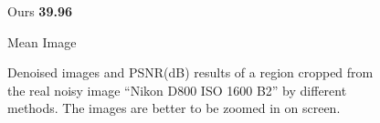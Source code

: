 \begin{figure}
{\begin{minipage}[t]{0.19\textwidth}
{\footnotesize Ours \textbf{39.96}}
\end{minipage}
\begin{minipage}[t]{0.19\textwidth}
\centering
{}
{\footnotesize Mean Image}
\end{minipage}
}
\caption{Denoised images and PSNR(dB) results of a region cropped from the real noisy image ``Nikon D800 ISO 1600 B2'' \cite{crosschannel2016} by different methods. The images are better to be zoomed in on screen.}
    \label{fig3-16}
\end{figure}


